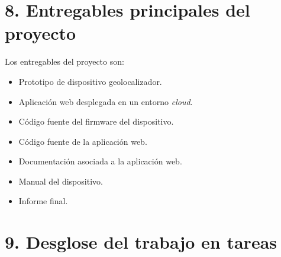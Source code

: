 \documentclass[
11pt, %
]{charter}
\begin{document}
\section{8. Entregables principales del proyecto}
\label{sec:entregables}


Los entregables del proyecto son:

\begin{itemize}
	\item Prototipo de dispositivo geolocalizador.
	\item Aplicación web desplegada en un entorno \textit{cloud}.
	\item Código fuente del firmware del dispositivo.
	\item Código fuente de la aplicación web.
	\item Documentación asociada a la aplicación web.
	\item Manual del dispositivo.
	\item Informe final.
\end{itemize}

\section{9. Desglose del trabajo en tareas}
\label{sec:wbs}
\end{document}
